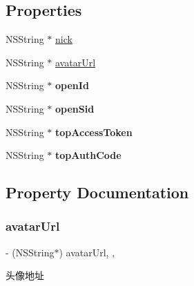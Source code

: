 \subsection*{Properties}
\begin{DoxyCompactItemize}
\item 
N\+S\+String $\ast$ \mbox{\hyperlink{interface_a_l_b_b_user_af663b73643d1e0d856bdcb8d1936bff7}{nick}}
\item 
N\+S\+String $\ast$ \mbox{\hyperlink{interface_a_l_b_b_user_a0f405af6d426b6176d36cc9d98af3b0c}{avatar\+Url}}
\item 
\mbox{\label{interface_a_l_b_b_user_a2a87f04397d34cb71c6b7fb81f739af7}} 
N\+S\+String $\ast$ {\bfseries open\+Id}
\item 
\mbox{\label{interface_a_l_b_b_user_a513978b57b41f3aaabcdccd44e2a5288}} 
N\+S\+String $\ast$ {\bfseries open\+Sid}
\item 
\mbox{\label{interface_a_l_b_b_user_abe80dabaa181a388ea85d3acbf68301c}} 
N\+S\+String $\ast$ {\bfseries top\+Access\+Token}
\item 
\mbox{\label{interface_a_l_b_b_user_a102f4ef4939d170392502a380971ee62}} 
N\+S\+String $\ast$ {\bfseries top\+Auth\+Code}
\end{DoxyCompactItemize}


\subsection{Property Documentation}
\mbox{\label{interface_a_l_b_b_user_a0f405af6d426b6176d36cc9d98af3b0c}} 
\subsubsection{\texorpdfstring{avatar\+Url}{avatarUrl}}
{\footnotesize\ttfamily -\/ (N\+S\+String$\ast$) avatar\+Url\hspace{0.3cm}{\ttfamily [read]}, {\ttfamily [nonatomic]}, {\ttfamily [copy]}}

头像地址 \mbox{\label{interface_a_l_b_b_user_af663b73643d1e0d856bdcb8d1936bff7}} 
